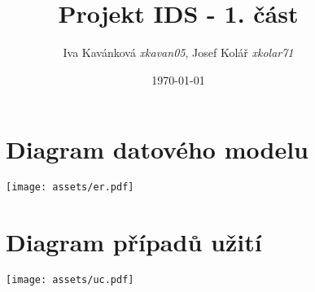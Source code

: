 \documentclass[12pt,titlepage,a4paper]{extarticle}
\title{Projekt IDS - 1. část}
\author{Iva Kavánková \emph{xkavan05}, Josef Kolář \emph{xkolar71}}
\date{\today}
\begin{document}

\pagestyle{fancy}
{
	\titleformat{\section}[block]{\Large\bfseries\filcenter}{}{0pt}{}
	\begin{landscape}
		\begin{figure}[H]
			\section{Diagram datového modelu}
			\centering
			\texttt{[image: assets/er.pdf]}
		\end{figure}
		
		\begin{figure}[H]
			\section{Diagram případů užití}
			\centering
			\texttt{[image: assets/uc.pdf]}
		\end{figure}
	\end{landscape}
	
}
\end{document}
